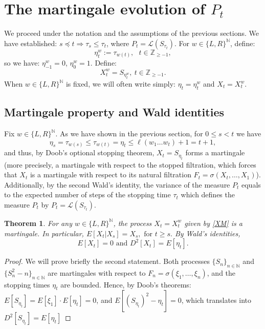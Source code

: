 \documentclass[10pt]{amsart}
\newtheorem{theorem}{Theorem}
\theoremstyle{definition}
\numberwithin{equation}{section}
\newcommand{\N}{\mathbb{N}}
\newcommand{\Z}{\mathbb{Z}}
\newcommand{\LL}{\mathcal{L}}
\begin{document}
\section{The martingale evolution of $P_t$}\label{martingale} 
We proceed under the notation and the assumptions of the previous sections. We have established: $s\preceq t \Rightarrow \tau_s\leq\tau_t$, where $P_{t}=\LL(S_{\tau_t})$. For  $w\in\{L,R\}^\N$, define:%
$$\eta^w_t:=\tau_{w(t)}, \ \ \  t\in\Z_{\geq -1},$$
so we have: $\eta^w_{-1}=0$,  $\eta^w_0=1$. Define:
\begin{equation}\label{XM}
X^w_{t}=S_{\eta^w_t},\ t\in\Z_{\geq -1}.
\end{equation}
When $w\in\{L,R\}^\N$ is fixed, we will often write simply: $\eta_t=\eta^w_t$ and $X_t=X_t^w$. 

\subsection{Martingale property and Wald identities} 
Fix $w\in\{L,R\}^\N$.
As we have shown in the previous section, for $0\leq s<t$ we have 
$$\eta_s=\tau_{w(s)}\leq\tau_{w(t)}=\eta_t\leq \ell(w_1\dots w_{t})+1=t+1,$$
  and thus, by Doob's optional stopping theorem, $X_t=S_{\eta_t}$ forms a martingale (more precisely, a martingale with respect to the stopped filtration, which forces that $X_t$ is a martingale with respect to its natural filtration $F_t=\sigma(X_t,\dots,X_1)$).  Additionally, by the second Wald's identity, the variance of the measure $P_t$ equals to the expected number of steps of  the stopping time $\tau_{t}$ which defines the measure $P_t$ by $P_t=\LL(S_{\tau_t})$. 
\begin{theorem}
For any $w\in\{L,R\}^\N$, the  process  $X_t=X_t^w$ given by \eqref{XM} is a martingale. In particular, $E[X_t|X_s]=X_{s},\mbox{ for }t\geq s.$
By Wald's identities, 
$$E[X_t]=0\mbox{ and }D^2[X_t]=E[\eta_t].$$ 
\end{theorem}
\begin{proof}
  
We will prove briefly  the second statement. Both processes $\{S_n\}_{n\in\mathbb{N}}$ and $\{S_n^2-n\}_{n\in\N}$ are martingales with respect to $F_n=\sigma(\xi_1,\dots,\xi_n)$, and the stopping times $\eta_t$ are bounded. Hence, by Doob's theorems: $E[S_{\eta_t}]=E[\xi_1]\cdot E[\eta_t]=0$, and $E[(S_{\eta_t})^2-\eta_t]=0$, which translates into $D^2[S_{\eta_t}]=E[\eta_t]$ 
\end{proof}
\end{document}
